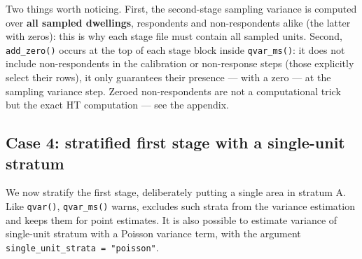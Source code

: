 \documentclass[
]{article}
\newenvironment{Shaded}{\begin{snugshade}}{\end{snugshade}}
\newcommand{\FunctionTok}[1]{\textcolor[rgb]{0.13,0.29,0.53}{\textbf{#1}}}
\newcommand{\NormalTok}[1]{#1}
\newcommand{\OtherTok}[1]{\textcolor[rgb]{0.56,0.35,0.01}{#1}}
\newcommand{\SpecialCharTok}[1]{\textcolor[rgb]{0.81,0.36,0.00}{\textbf{#1}}}
\newcommand{\StringTok}[1]{\textcolor[rgb]{0.31,0.60,0.02}{#1}}
\begin{document}
Two things worth noticing. First, the second-stage sampling variance is
computed over \textbf{all sampled dwellings}, respondents and
non-respondents alike (the latter with zeros): this is why each stage
file must contain all sampled units. Second, \texttt{add\_zero()} occurs
at the top of each stage block inside \texttt{qvar\_ms()}: it does not
include non-respondents in the calibration or non-response steps (those
explicitly select their rows), it only guarantees their presence ---
with a zero --- at the sampling variance step. Zeroed non-respondents
are not a computational trick but the exact HT computation --- see the
appendix.

\subsection{Case 4: stratified first stage with a single-unit
stratum}\label{case-4-stratified-first-stage-with-a-single-unit-stratum}

We now stratify the first stage, deliberately putting a single area in
stratum A. Like \texttt{qvar()}, \texttt{qvar\_ms()} warns, excludes
such strata from the variance estimation and keeps them for point
estimates. It is also possible to estimate variance of single-unit
stratum with a Poisson variance term, with the argument
\texttt{single\_unit\_strata\ =\ "poisson"}.

\begin{Shaded}
\end{Shaded}
\end{document}
